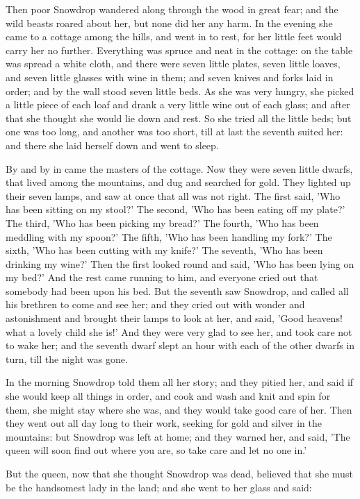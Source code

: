 \documentclass[12pt]{book}
\begin{document}
Then poor Snowdrop wandered along through the wood in great fear; and
the wild beasts roared about her, but none did her any harm. In the
evening she came to a cottage among the hills, and went in to rest,
for her little feet would carry her no further. Everything was spruce
and neat in the cottage: on the table was spread a white cloth, and
there were seven little plates, seven little loaves, and seven little
glasses with wine in them; and seven knives and forks laid in order;
and by the wall stood seven little beds. As she was very hungry, she
picked a little piece of each loaf and drank a very little wine out of
each glass; and after that she thought she would lie down and rest. So
she tried all the little beds; but one was too long, and another was
too short, till at last the seventh suited her: and there she laid
herself down and went to sleep.

By and by in came the masters of the cottage. Now they were seven
little dwarfs, that lived among the mountains, and dug and searched
for gold. They lighted up their seven lamps, and saw at once that all
was not right. The first said, 'Who has been sitting on my stool?' The
second, 'Who has been eating off my plate?' The third, 'Who has been
picking my bread?' The fourth, 'Who has been meddling with my spoon?'
The fifth, 'Who has been handling my fork?' The sixth, 'Who has been
cutting with my knife?' The seventh, 'Who has been drinking my wine?'
Then the first looked round and said, 'Who has been lying on my bed?'
And the rest came running to him, and everyone cried out that somebody
had been upon his bed. But the seventh saw Snowdrop, and called all
his brethren to come and see her; and they cried out with wonder and
astonishment and brought their lamps to look at her, and said, 'Good
heavens! what a lovely child she is!' And they were very glad to see
her, and took care not to wake her; and the seventh dwarf slept an
hour with each of the other dwarfs in turn, till the night was gone.

In the morning Snowdrop told them all her story; and they pitied her,
and said if she would keep all things in order, and cook and wash and
knit and spin for them, she might stay where she was, and they would
take good care of her. Then they went out all day long to their work,
seeking for gold and silver in the mountains: but Snowdrop was left at
home; and they warned her, and said, 'The queen will soon find out
where you are, so take care and let no one in.'

But the queen, now that she thought Snowdrop was dead, believed that
she must be the handsomest lady in the land; and she went to her glass
and said:
\end{document}
